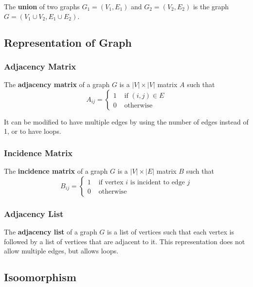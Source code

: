 \documentclass[a4paper,12pt]{article}
\begin{document}
The \textbf{union} of two graphs $G_1 = (V_1, E_1)$ and $G_2 = (V_2, E_2)$ is the graph $G = (V_1 \cup V_2, E_1 \cup E_2)$.

\subsection{Representation of Graph}

\subsubsection{Adjacency Matrix}

The \textbf{adjacency matrix} of a graph $G$ is a $|V| \times |V|$ matrix $A$ such that
\begin{equation*}
	A_{ij} = \begin{cases}
		1 & \text{ if } (i,j) \in E \\
		0 & \text{ otherwise}
	\end{cases}
\end{equation*}

It can be modified to have multiple edges by using the number of edges instead of 1, or to have loops.

\subsubsection{Incidence Matrix}

The \textbf{incidence matrix} of a graph $G$ is a $|V| \times |E|$ matrix $B$ such that
\begin{equation*}
	B_{ij} = \begin{cases}
		1 & \text{ if vertex } i \text{ is incident to edge } j \\
		0 & \text{ otherwise}
	\end{cases}
\end{equation*}

\subsubsection{Adjacency List}

The \textbf{adjacency list} of a graph $G$ is a list of vertices such that each vertex is followed by a list of vertices that are adjacent to it.
This representation does not allow multiple edges, but allows loops.

\subsection{Isoomorphism}
\end{document}
